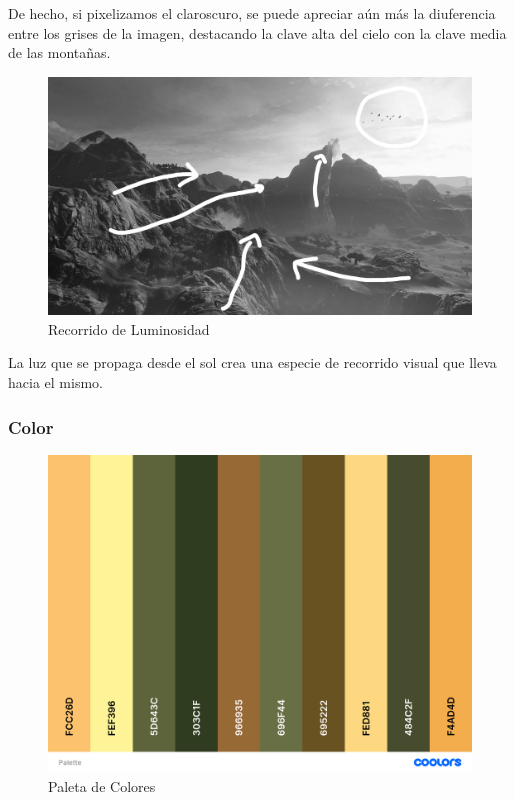 \documentclass[12pt]{article}
\begin{document}
          De hecho, si pixelizamos el claroscuro, se puede apreciar aún más la diuferencia entre los grises de la imagen, destacando la clave alta del cielo con la clave media de las montañas.

          \begin{figure}[H]
            \centering
            \includegraphics[scale = 0.2]{images/Jesus/Seccion16/recorrido luz.jpg}
            \caption{Recorrido de Luminosidad}
          \end{figure}  

          La luz que se propaga desde el sol crea una especie de recorrido visual que lleva hacia el mismo. 


        \subsubsection{Color}

          \begin{figure}[H]
            \centering
            \includegraphics[scale = 0.2]{images/Jesus/Seccion16/palette.png}
            \caption{Paleta de Colores}
          \end{figure} 
\end{document}
